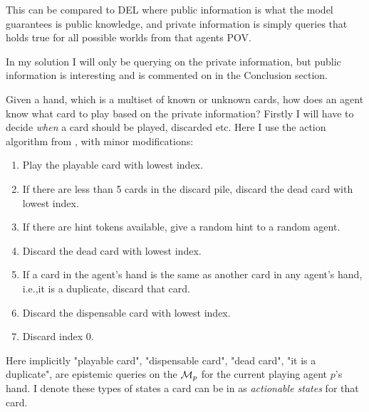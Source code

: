 This can be compared to DEL where public information is what the model guarantees is public knowledge, and private information is simply queries that holds true for all possible worlds from that agents POV.

In my solution I will only be querying on the private information, but public information is interesting and is commented on in the Conclusion section.

Given a hand, which is a multiset of known or unknown cards, how does an agent know what card to play based on the private information?
Firstly I will have to decide \emph{when} a card should be played, discarded etc. Here I use the action algorithm from \cite{CoxEtAl2015}, with minor modifications:
\begin{enumerate}
	\item Play the playable card with lowest index.
	\item If there are less than 5 cards in the discard pile, discard the dead card with lowest index.
	\item If there are hint tokens available, give a random hint to a random agent.
	\item Discard the dead card with lowest index.
	\item If a card in the agent’s hand is the same as another card in any agent’s hand, i.e.,it is a duplicate, discard that card.
	\item Discard the dispensable card with lowest index.
	\item Discard index 0.
\end{enumerate}

Here implicitly "playable card", "dispensable card", "dead card", "it is a duplicate", are epistemic queries on the $\mathcal{M}_p$ for the current playing agent $p$'s hand. I denote these types of states a card can be in as \emph{actionable states} for that card.

